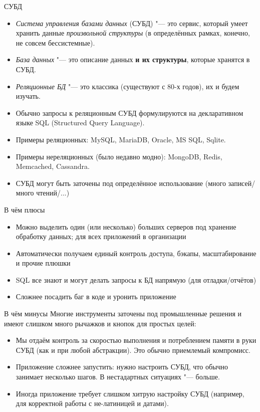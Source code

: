 \begin{frame}[t]{СУБД}
	\begin{itemize}
		\item \textit{Система управления базами данных} (СУБД) "--- это сервис, который умеет хранить данные \textit{произвольной структуры}
			(в определённых рамках, конечно, не совсем бессистемные).
		\item \textit{База данных} "--- это описание данных \textbf{и их структуры}, которые хранятся в СУБД.
		\item \textit{Реляционные БД} "--- это классика (существуют с 80-х годов), их и будем изучать.
		\item Обычно запросы к реляционным СУБД формулируются на декларативном языке SQL
			(Structured Query Language).
		\item Примеры реляционных: MySQL, MariaDB, Oracle, MS SQL, Sqlite.
		\item Примеры нереляционных (было недавно модно): MongoDB, Redis, Memcached, Cassandra.
		\item СУБД могут быть заточены под определённое использование (много записей/много чтений/...)
	\end{itemize}
\end{frame}

\begin{frame}[t]{В чём плюсы}
	\begin{itemize}
		\item Можно выделить один (или несколько) больших серверов под хранение обработку данных; для всех приложений в организации
		\item Автоматически получаем единый контроль доступа, бэкапы, масштабирование и прочие плюшки
		\item SQL все знают и могут делать запросы к БД напрямую (для отладки/отчётов)
		\item Сложнее посадить баг в коде и уронить приложение
	\end{itemize}
\end{frame}

\begin{frame}{В чём минусы}
	Многие инструменты заточены под промышленные решения и имеют слишком много рычажков и кнопок
	для простых целей:
	\begin{itemize}
		\item
			Мы отдаём контроль за скоростью выполнения и потреблением памяти в руки СУБД
			(как и при любой абстракции).
			Это обычно приемлемый компромисс.
		\item
			Приложение сложнее запустить: нужно настроить СУБД, что обычно занимает несколько шагов.
			В нестадартных ситуациях "--- больше.
		\item
			Иногда приложение требует слишком хитрую настройку СУБД (например, для корректной работы
			с не-латиницей и датами).
	\end{itemize}
\end{frame}

